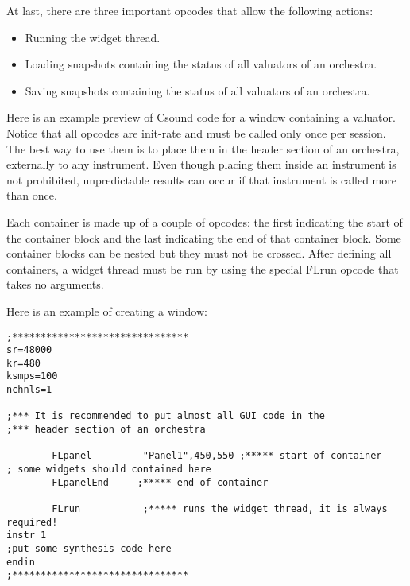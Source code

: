  At last, there are three important opcodes that allow the following actions: 


 
\begin{itemize}
\item 

 Running the widget thread.

\item 

 Loading snapshots containing the status of all valuators of an orchestra.

\item 

 Saving snapshots containing the status of all valuators of an orchestra.


\end{itemize}


  Here is an example preview of Csound code for a window containing a valuator. Notice that all opcodes are init-rate and must be called only once per session. The best way to use them is to place them in the header section of an orchestra, externally to any instrument. Even though placing them inside an instrument is not prohibited, unpredictable results can occur if that instrument is called more than once. 


  Each container is made up of a couple of opcodes: the first indicating the start of the container block and the last indicating the end of that container block. Some container blocks can be nested but they must not be crossed. After defining all containers, a widget thread must be run by using the special FLrun opcode that takes no arguments. 


  Here is an example of creating a window: 


 
\begin{lstlisting}
;*******************************
sr=48000
kr=480
ksmps=100
nchnls=1

;*** It is recommended to put almost all GUI code in the
;*** header section of an orchestra

        FLpanel         "Panel1",450,550 ;***** start of container
; some widgets should contained here
        FLpanelEnd     ;***** end of container

        FLrun           ;***** runs the widget thread, it is always required!
instr 1
;put some synthesis code here
endin
;*******************************
      
\end{lstlisting}


